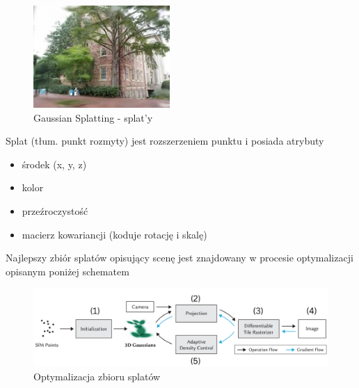 \begin{figure}[!htb]
      \includegraphics[width=\linewidth]{img/sota/gaussiansplattingobject.jpg}
      \caption{Gaussian Splatting - splat'y}\label{fig:gaussplat_example}
    \endminipage
\end{figure}

Splat (tłum. punkt rozmyty) jest rozszerzeniem punktu i posiada atrybuty
\begin{itemize}
    \item środek (x, y, z)
    \item kolor
    \item przeźroczystość
    \item macierz kowariancji (koduje rotację i skalę)
\end{itemize}

Najlepszy zbiór splatów opisujący scenę jest znajdowany w procesie optymalizacji opisanym poniżej schematem

\begin{figure}[!htb]
    \includegraphics[width=\linewidth]{img/sota/gaussian_splatting_flow.png}
    \caption{Optymalizacja zbioru splatów}\label{fig:splatting_algorithm}
\end{figure}

